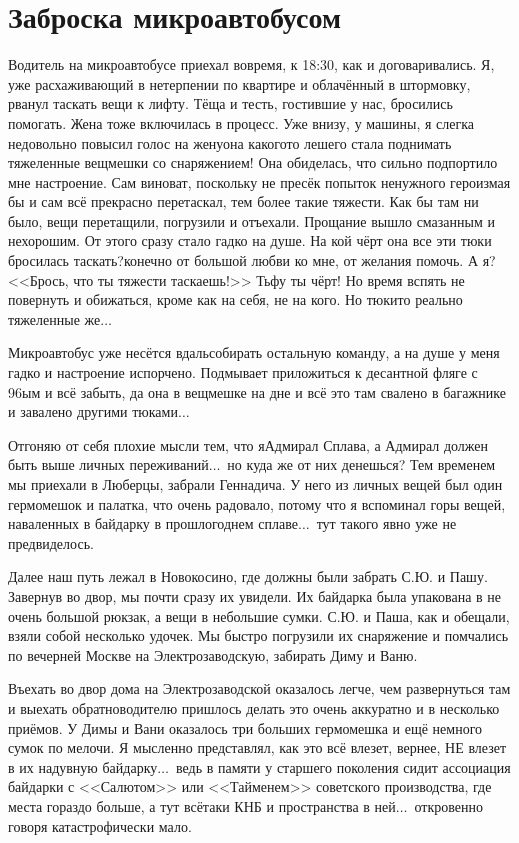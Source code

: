 \chapter{Заброска микроавтобусом} 

Водитель на микроавтобусе приехал вовремя, к 18:30, как и договаривались. Я, уже расхаживающий в нетерпении по квартире и облачённый в штормовку, рванул таскать вещи к лифту. Тёща и тесть, гостившие у нас, бросились помогать. Жена тоже включилась в процесс. Уже внизу, у машины, я слегка недовольно повысил голос на жену\mdash она какого\sdash то лешего стала поднимать тяжеленные вещмешки со снаряжением! Она обиделась, что сильно подпортило мне настроение. Сам виноват, поскольку не пресёк попыток ненужного героизма\mdash я бы и сам всё прекрасно перетаскал, тем более такие тяжести. Как бы там ни было, вещи перетащили, погрузили и отъехали. Прощание вышло смазанным и нехорошим. От этого сразу стало гадко на душе. На кой чёрт она все эти тюки бросилась таскать?\mdash конечно от большой любви ко мне, от желания помочь. А я?\mdash  <<Брось, что ты тяжести таскаешь!>> Тьфу ты чёрт! Но время вспять не повернуть и обижаться, кроме как на себя, не на кого. Но тюки\sdash то реально тяжеленные же$\ldots$~ 

Микроавтобус уже несётся вдаль\mdash собирать остальную команду, а на душе у меня гадко и настроение испорчено. Подмывает приложиться к десантной фляге с 96\sdash ым и всё забыть, да она в вещмешке на дне и всё это там свалено в багажнике и завалено другими тюками$\ldots$ 
 
Отгоняю от себя плохие мысли тем, что я\mdash Адмирал Сплава, а Адмирал должен быть выше личных переживаний$\ldots$~но куда же от них денешься? Тем временем мы приехали в Люберцы, забрали Геннадича. У него из личных вещей был один гермомешок и палатка, что очень радовало, потому что я вспоминал горы вещей, наваленных в байдарку в прошлогоднем сплаве$\ldots$~тут такого явно уже не предвиделось.  

Далее наш путь лежал в Новокосино, где должны были забрать С.Ю. и Пашу. Завернув во двор, мы почти сразу их увидели. Их байдарка была упакована в не очень большой рюкзак, а вещи в небольшие сумки. С.Ю. и Паша, как и обещали, взяли собой несколько удочек. Мы быстро погрузили их снаряжение и помчались по вечерней Москве на Электрозаводскую, забирать Диму и Ваню. 

Въехать во двор дома на Электрозаводской оказалось легче, чем развернуться там и выехать обратно\mdash водителю пришлось делать это очень аккуратно и в несколько приёмов. У Димы и Вани оказалось три больших гермомешка и ещё немного сумок по мелочи. Я мысленно представлял, как это всё влезет, вернее, НЕ влезет в их надувную байдарку$\ldots$~ведь в памяти у старшего поколения сидит ассоциация байдарки с <<Салютом>> или <<Тайменем>> советского производства, где места гораздо больше, а тут всё\sdash таки КНБ и пространства в ней$\ldots$~откровенно говоря катастрофически мало.

